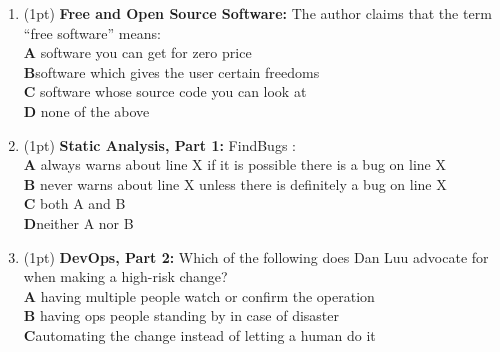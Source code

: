 \documentclass{report}
\newif\ifkey
\newcommand{\correct}[1]{\ifkey\color{red}\textbf{#1}\color{black}\else\textbf{#1}\fi\xspace}
\newcommand*{\pts}[1]{\addtocounter{points}{#1}(#1pt)}
\begin{document}
\begin{spacing}{1.4}
\begin{enumerate}[leftmargin=*]
\item \pts{1}
  \textbf{Free and Open Source Software:}
  The author claims that the term “free software” means:
  \\ \textbf{A}\hspace{0.2in} software you can get for zero price
  \\ \correct{B}\hspace{0.2in}software which gives the user certain freedoms
  \\ \textbf{C}\hspace{0.2in} software whose source code you can look at
  \\ \textbf{D}\hspace{0.2in} none of the above


\item \pts{1}
  \textbf{Static Analysis, Part 1:}
  FindBugs \underline{\hspace{1in}}:
  \\ \textbf{A}\hspace{0.2in} always warns about line X if it is possible there is a bug on line X
  \\ \textbf{B}\hspace{0.2in} never warns about line X unless there is definitely a bug on line X
  \\ \textbf{C}\hspace{0.2in} both A and B
  \\ \correct{D}\hspace{0.2in}neither A nor B

\item \pts{1}
  \textbf{DevOps, Part 2:}
  Which of the following does Dan Luu advocate for when making a high-risk change?
  \\ \textbf{A}\hspace{0.2in} having multiple people watch or confirm the operation
  \\ \textbf{B}\hspace{0.2in} having ops people standing by in case of disaster
  \\ \correct{C}\hspace{0.2in}automating the change instead of letting a human do it
 


\end{enumerate}
\end{spacing}
\end{document}
